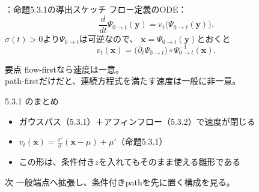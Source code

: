 \assuppl
\begin{frame}{\supplmark：命題5.3.1の導出スケッチ}
    フロー定義のODE：
    \[
        \dfrac{d}{dt}\Psi_{0\to t}(\bm{y})
        =
        v_t\bigl(\Psi_{0\to t}(\bm{y})\bigr).
    \]
    $\sigma(t)>0$より$\Psi_{0\to t}$は可逆なので、
    $\bm{x}=\Psi_{0\to t}(\bm{y})$とおくと
    \[
        v_t(\bm{x})
        =
        \bigl(\partial_t\Psi_{0\to t}\bigr)
        \circ
        \Psi_{0\to t}^{-1}(\bm{x}).
    \]
    \begin{exampleblock}{要点}
        flow-firstなら速度は一意。\\
        path-firstだけだと、連続方程式を満たす速度は一般に非一意。
    \end{exampleblock}
\end{frame}
\asmain
\begin{frame}{5.3.1 のまとめ}
    \begin{itemize}
        \item ガウスパス（5.3.1）＋アフィンフロー（5.3.2）で速度が閉じる
        \item $v_t(\bm{x})=\frac{\sigma'}{\sigma}(\bm{x}-\mu)+\mu'$（命題5.3.1）
        \item この形は、条件付き$z$を入れてもそのまま使える雛形である
    \end{itemize}
    \begin{block}{次}
        一般端点へ拡張し、条件付きpathを先に置く構成を見る。
    \end{block}
\end{frame}

